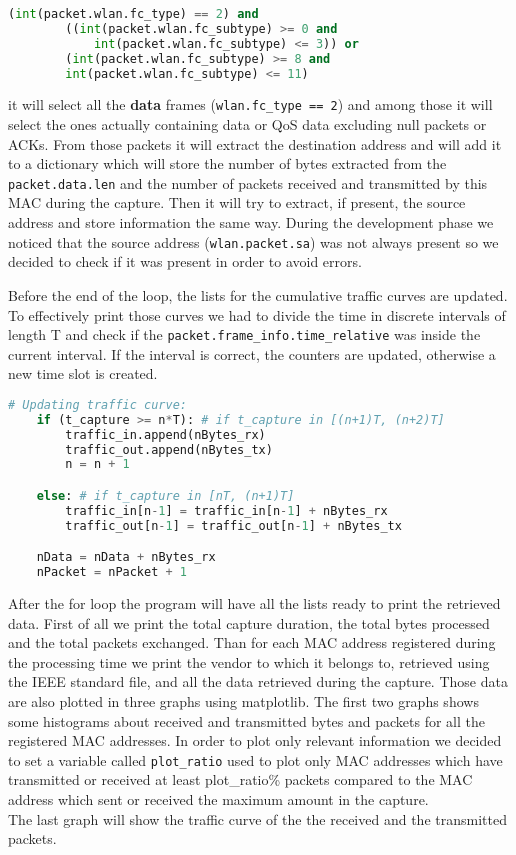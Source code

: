 \begin{lstlisting}[language=Python, caption=Packet filter]
    (int(packet.wlan.fc_type) == 2) and 
        ((int(packet.wlan.fc_subtype) >= 0 and 
            int(packet.wlan.fc_subtype) <= 3)) or
        (int(packet.wlan.fc_subtype) >= 8 and 
        int(packet.wlan.fc_subtype) <= 11)
\end{lstlisting}
it will select all the \textbf{data} frames (\texttt{wlan.fc\_type == 2}) and among those it will 
select the ones actually containing data or QoS data excluding null packets or ACKs. From 
those packets it will extract the destination address and will add it to a dictionary
which will store the number of bytes extracted from the \texttt{packet.data.len} and 
the number of packets received and transmitted by this MAC during the capture.
Then it will try to extract, if present, the source address and store information the same 
way. During the development phase we noticed that the source address (\texttt{wlan.packet.sa}) was 
not always present so we decided to check if it was present in order to avoid errors.

Before the end of the loop, the lists for the cumulative traffic curves are updated. To 
effectively print those curves we had to divide the time in discrete intervals of length T and 
check if the \texttt{packet.frame\_info.time\_relative} was inside the current interval. If the
interval is correct, the counters are updated, otherwise a new time slot is created.

\begin{lstlisting}[language=Python, caption=Traffic curves setup]
    # Updating traffic curve:
    if (t_capture >= n*T): # if t_capture in [(n+1)T, (n+2)T]
        traffic_in.append(nBytes_rx)
        traffic_out.append(nBytes_tx)
        n = n + 1

    else: # if t_capture in [nT, (n+1)T]
        traffic_in[n-1] = traffic_in[n-1] + nBytes_rx
        traffic_out[n-1] = traffic_out[n-1] + nBytes_tx

    nData = nData + nBytes_rx
    nPacket = nPacket + 1
\end{lstlisting}

After the for loop the program will have all the lists ready to print the retrieved data.
First of all we print the total capture duration, the total bytes processed and the total 
packets exchanged. Than for each MAC address registered during the processing time we print
the vendor to which it belongs to, retrieved using the IEEE standard file, and all the 
data retrieved during the capture. Those data are also plotted in three graphs using matplotlib.
The first two graphs shows some histograms about received and transmitted bytes and packets for
all the registered MAC addresses. In order to plot only relevant information we decided to set
a variable called \texttt{plot\_ratio} used to plot only MAC addresses which have transmitted
or received at least plot\_ratio\% packets compared to the MAC address which sent or received 
the maximum amount in the capture.\\
The last graph will show the traffic curve of the the received and the transmitted packets.
